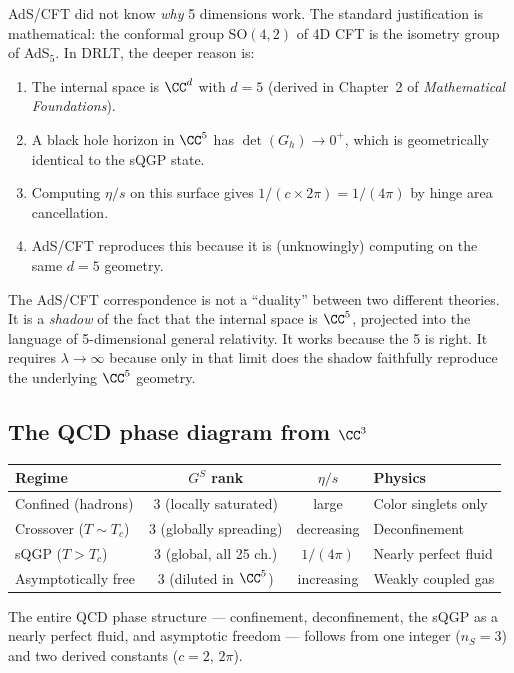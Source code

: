AdS/CFT did not know \emph{why} 5 dimensions work. The standard justification is mathematical: the conformal group $\text{SO}(4,2)$ of 4D CFT is the isometry group of AdS$_5$. In DRLT, the deeper reason is:

\begin{enumerate}
\item The internal space is $\CC^d$ with $d = 5$ (derived in Chapter~2 of \textit{Mathematical Foundations}).
\item A black hole horizon in $\CC^5$ has $\det(G_h) \to 0^+$, which is geometrically identical to the sQGP state.
\item Computing $\eta/s$ on this surface gives $1/(c \times 2\pi) = 1/(4\pi)$ by hinge area cancellation.
\item AdS/CFT reproduces this because it is (unknowingly) computing on the same $d = 5$ geometry.
\end{enumerate}

The AdS/CFT correspondence is not a ``duality'' between two different theories. It is a \emph{shadow} of the fact that the internal space is $\CC^5$, projected into the language of 5-dimensional general relativity. It works because the 5 is right. It requires $\lambda \to \infty$ because only in that limit does the shadow faithfully reproduce the underlying $\CC^5$ geometry.

\subsection{The QCD phase diagram from $\CC^3$}

\begin{center}
\begin{tabular}{lccl}
\hline
Regime & $G^S$ rank & $\eta/s$ & Physics \\
\hline
Confined (hadrons) & 3 (locally saturated) & large & Color singlets only \\
Crossover ($T \sim T_c$) & 3 (globally spreading) & decreasing & Deconfinement \\
sQGP ($T > T_c$) & 3 (global, all 25 ch.) & $1/(4\pi)$ & Nearly perfect fluid \\
Asymptotically free & 3 (diluted in $\CC^5$) & increasing & Weakly coupled gas \\
\hline
\end{tabular}
\end{center}

The entire QCD phase structure --- confinement, deconfinement, the sQGP as a nearly perfect fluid, and asymptotic freedom --- follows from one integer ($n_S = 3$) and two derived constants ($c = 2$, $2\pi$).

